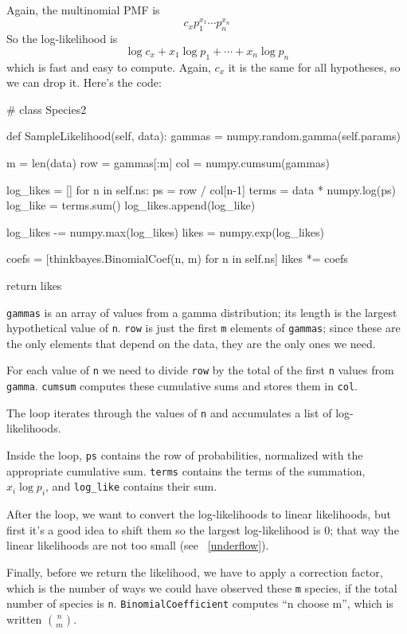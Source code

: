 \documentclass[12pt]{book}
\theoremstyle{exercise}
\newcommand{\py}[1]{{\tt #1}}%
\begin{document}
Again, the multinomial PMF is
%
\[ c_x p_1^{x_1} \cdots p_n^{x_n} \]
%
So the log-likelihood is
%
\[ \log c_x + x_1 \log p_1 + \cdots + x_n \log p_n \]
%
which is fast and easy to compute.  Again, $c_x$
it is the same for all hypotheses, so we can drop it.
Here's the code:

\begin{code}
# class Species2

    def SampleLikelihood(self, data):
        gammas = numpy.random.gamma(self.params)

        m = len(data)
        row = gammas[:m]
        col = numpy.cumsum(gammas)

        log_likes = []
        for n in self.ns:
            ps = row / col[n-1]
            terms = data * numpy.log(ps)
            log_like = terms.sum()
            log_likes.append(log_like)

        log_likes -= numpy.max(log_likes)
        likes = numpy.exp(log_likes)

        coefs = [thinkbayes.BinomialCoef(n, m) for n in self.ns]
        likes *= coefs

        return likes
\end{code}

\py{gammas} is an array of values from a gamma distribution; its
length is the largest hypothetical value of \py{n}.  \py{row} is
just the first \py{m} elements of \py{gammas}; since these are the
only elements that depend on the data, they are the only ones we need.

For each value of \py{n} we need to divide \py{row} by the
total of the first \py{n} values from \py{gamma}.  \py{cumsum}
computes these cumulative sums and stores them in \py{col}.

The loop iterates through the values of \py{n} and accumulates
a list of log-likelihoods.

Inside the loop, \py{ps} contains the row of probabilities, normalized
with the appropriate cumulative sum.  \py{terms} contains the
terms of the summation, $x_i \log p_i$, and \verb"log_like" contains
their sum.

After the loop, we want to convert the log-likelihoods to linear
likelihoods, but first it's a good idea to shift them so the largest
log-likelihood is 0; that way the linear likelihoods are not too
small (see ~\ref{underflow}).

Finally, before we return the likelihood, we have to apply a correction
factor, which is the number of ways we could have observed these \py{m}
species, if the total number of species is \py{n}.
\py{BinomialCoefficient} computes ``n choose m'', which is written
$\binom{n}{m}$.
\end{document}

